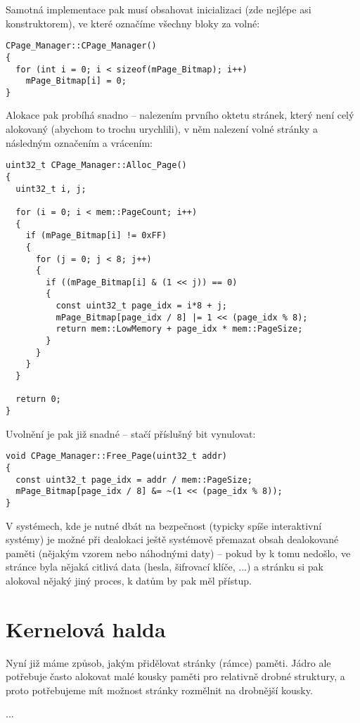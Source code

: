 \documentclass{article}
\begin{document}
Samotná implementace pak musí obsahovat inicializaci (zde nejlépe asi konstruktorem), ve které označíme všechny bloky za volné:
\begin{lstlisting}
CPage_Manager::CPage_Manager()
{
  for (int i = 0; i < sizeof(mPage_Bitmap); i++)
    mPage_Bitmap[i] = 0;
}
\end{lstlisting}
Alokace pak probíhá snadno -- nalezením prvního oktetu stránek, který není celý alokovaný (abychom to trochu urychlili), v něm nalezení volné stránky a následným označením a vrácením:
\begin{lstlisting}
uint32_t CPage_Manager::Alloc_Page()
{
  uint32_t i, j;
	
  for (i = 0; i < mem::PageCount; i++)
  {
    if (mPage_Bitmap[i] != 0xFF)
    {
      for (j = 0; j < 8; j++)
      {
        if ((mPage_Bitmap[i] & (1 << j)) == 0)
        {
          const uint32_t page_idx = i*8 + j;
          mPage_Bitmap[page_idx / 8] |= 1 << (page_idx % 8);
          return mem::LowMemory + page_idx * mem::PageSize;
        }
      }
    }
  }

  return 0;
}
\end{lstlisting}
Uvolnění je pak již snadné -- stačí příslušný bit vynulovat:
\begin{lstlisting}
void CPage_Manager::Free_Page(uint32_t addr)
{
  const uint32_t page_idx = addr / mem::PageSize;
  mPage_Bitmap[page_idx / 8] &= ~(1 << (page_idx % 8));
}
\end{lstlisting}
V systémech, kde je nutné dbát na bezpečnost (typicky spíše interaktivní systémy) je možné při dealokaci ještě systémově přemazat obsah dealokované paměti (nějakým vzorem nebo náhodnými daty) -- pokud by k tomu nedošlo, ve stránce byla nějaká citlivá data (hesla, šifrovací klíče, ...) a stránku si pak alokoval nějaký jiný proces, k datům by pak měl přístup.

\section{Kernelová halda}

Nyní již máme způsob, jakým přidělovat stránky (rámce) paměti. Jádro ale potřebuje často alokovat malé kousky paměti pro relativně drobné struktury, a proto potřebujeme mít možnost stránky rozmělnit na drobnější kousky.

...
\end{document}
